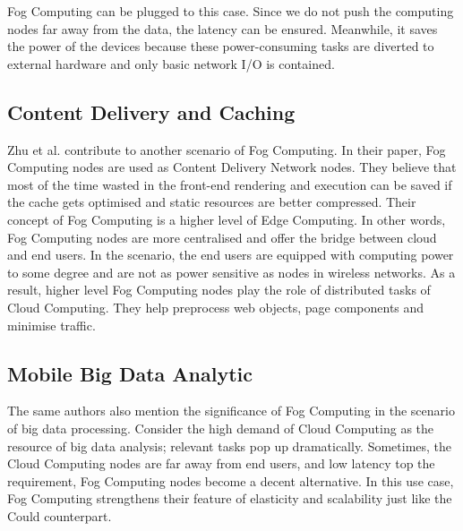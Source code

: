 Fog Computing can be plugged to this case. Since we do not push the computing nodes far away from the data, the latency can be ensured. Meanwhile, it saves the power of the devices because these power-consuming tasks are diverted to external hardware and only basic network I/O is contained.

\subsection{Content Delivery and Caching}
Zhu et al. contribute to another scenario of Fog Computing. In their paper, Fog Computing nodes are used as Content Delivery Network nodes. They believe that most of the time wasted in the front-end rendering and execution can be saved if the cache gets optimised and static resources are better compressed. Their concept of Fog Computing is a higher level of Edge Computing. In other words, Fog Computing nodes are more centralised and offer the bridge between cloud and end users. In the scenario, the end users are equipped with computing power to some degree and are not as power sensitive as nodes in wireless networks. As a result, higher level Fog Computing nodes play the role of distributed tasks of Cloud Computing. They help preprocess web objects, page components and minimise traffic.

\subsection{Mobile Big Data Analytic}
The same authors also mention the significance of Fog Computing in the scenario of big data processing. Consider the high demand of Cloud Computing as the resource of big data analysis; relevant tasks pop up dramatically. Sometimes, the Cloud Computing nodes are far away from end users, and low latency top the requirement, Fog Computing nodes become a decent alternative. In this use case, Fog Computing strengthens their feature of elasticity and scalability just like the Could counterpart.